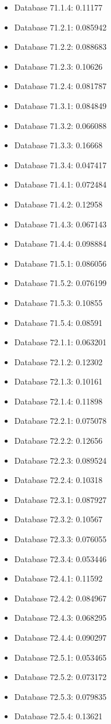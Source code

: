 \begin{itemize}
\item Database 71.1.4: 0.11177
\item Database 71.2.1: 0.085942
\item Database 71.2.2: 0.088683
\item Database 71.2.3: 0.10626
\item Database 71.2.4: 0.081787
\item Database 71.3.1: 0.084849
\item Database 71.3.2: 0.066088
\item Database 71.3.3: 0.16668
\item Database 71.3.4: 0.047417
\item Database 71.4.1: 0.072484
\item Database 71.4.2: 0.12958
\item Database 71.4.3: 0.067143
\item Database 71.4.4: 0.098884
\item Database 71.5.1: 0.086056
\item Database 71.5.2: 0.076199
\item Database 71.5.3: 0.10855
\item Database 71.5.4: 0.08591
\item Database 72.1.1: 0.063201
\item Database 72.1.2: 0.12302
\item Database 72.1.3: 0.10161
\item Database 72.1.4: 0.11898
\item Database 72.2.1: 0.075078
\item Database 72.2.2: 0.12656
\item Database 72.2.3: 0.089524
\item Database 72.2.4: 0.10318
\item Database 72.3.1: 0.087927
\item Database 72.3.2: 0.10567
\item Database 72.3.3: 0.076055
\item Database 72.3.4: 0.053446
\item Database 72.4.1: 0.11592
\item Database 72.4.2: 0.084967
\item Database 72.4.3: 0.068295
\item Database 72.4.4: 0.090297
\item Database 72.5.1: 0.053465
\item Database 72.5.2: 0.073172
\item Database 72.5.3: 0.079835
\item Database 72.5.4: 0.13621

\end{itemize}
